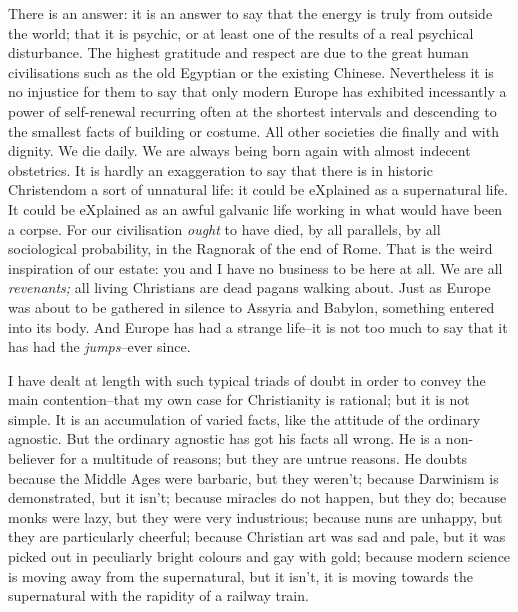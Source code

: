 \documentclass{book}
\begin{document}
There is an answer: it is an answer to say that the energy is truly from outside the world; that it is psychic, or at least one of the results of a real psychical disturbance. The highest gratitude and respect are due to the great human civilisations such as the old Egyptian or the existing Chinese. Nevertheless it is no injustice for them to say that only modern Europe has exhibited incessantly a power of self-renewal recurring often at the shortest intervals and descending to the smallest facts of building or costume. All other societies die finally and with dignity. We die daily. We are always being born again with almost indecent obstetrics. It is hardly an exaggeration to say that there is in historic Christendom a sort of unnatural life: it could be eXplained as a supernatural life. It could be eXplained as an awful galvanic life working in what would have been a corpse. For our civilisation \emph{ought} to have died, by all parallels, by all sociological probability, in the Ragnorak of the end of Rome. That is the weird inspiration of our estate: you and I have no business to be here at all. We are all \emph{revenants;} all living Christians are dead pagans walking about. Just as Europe was about to be gathered in silence to Assyria and Babylon, something entered into its body. And Europe has had a strange life–it is not too much to say that it has had the \emph{jumps}–ever since.

I have dealt at length with such typical triads of doubt in order to convey the main contention–that my own case for Christianity is rational; but it is not simple. It is an accumulation of varied facts, like the attitude of the ordinary agnostic. But the ordinary agnostic has got his facts all wrong. He is a non-believer for a multitude of reasons; but they are untrue reasons. He doubts because the Middle Ages were barbaric, but they weren’t; because Darwinism is demonstrated, but it isn’t; because miracles do not happen, but they do; because monks were lazy, but they were very industrious; because nuns are unhappy, but they are particularly cheerful; because Christian art was sad and pale, but it was picked out in peculiarly bright colours and gay with gold; because modern science is moving away from the supernatural, but it isn’t, it is moving towards the supernatural with the rapidity of a railway train.
\end{document}
